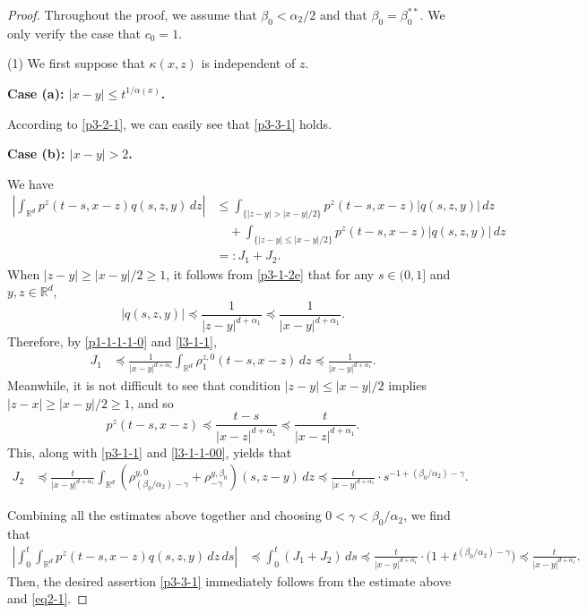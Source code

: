 \documentclass[a4paper,11pt]{amsart}
\renewcommand{\le}{\leqslant}
\renewcommand{\ge}{\geqslant}
\newcommand{\R}{\mathds R}
\newcommand{\B}{\beta}
\newcommand{\p}{\preceq}
\newcommand{\K}{\kappa}
\newcommand{\A}{\alpha}
\newcommand{\G}{\gamma}
\theoremstyle{definition}
\begin{document}
\begin{proof} Throughout the proof, we assume that $\B_0<\A_2/2$ and that $\B_0=\B_0^{**}.$ We only verify the case that $c_0=1$.

(1) We first suppose that $\K(x,z)$ is independent of $z$.

{\bf Case (a): $|x-y|\le t^{1/\A(x)}$.}


According to \eqref{p3-2-1}, we can easily see that \eqref{p3-3-1} holds.


{\bf Case (b): $|x-y|>2$.}

We have
\begin{equation}\label{p3-3-2}
\begin{split}
 \left|\int_{\R^d} p^z(t-s,x-z)q(s,z,y)\,dz\right|
&\le \int_{\{|z-y|>{|x-y|}/{2}\}} p^z(t-s,x-z)|q(s,z,y)|\,dz\\
&\quad
+\int_{\{|z-y|\le {|x-y|}/{2}\}} p^z(t-s,x-z)|q(s,z,y)|\,dz\\
&=:J_1+J_2.
\end{split}
\end{equation}When $|z-y|\ge {|x-y|}/{2}\ge 1$, it follows from \eqref{p3-1-2e} that for any $s\in (0,1]$ and $y,z\in \R^d$,
\begin{equation*}
|q(s,z,y)|\p \frac{1}{|z-y|^{d+\A_1}}\p \frac{1}{|x-y|^{d+\A_1}}.
\end{equation*}
Therefore, by \eqref{p1-1-1-1-0} and \eqref{l3-1-1},
\begin{align*}
J_1&\p \frac{1}{|x-y|^{d+\A_1}}\int_{\R^d}\rho^{z,0}_1(t-s,x-z)\, dz\p \frac{1}{|x-y|^{d+\A_1}}.
\end{align*}
Meanwhile, it is not difficult to see that condition $|z-y|\le {|x-y|}/{2}$ implies
$|z-x|\ge {|x-y|}/{2}\ge 1$, and so
\begin{equation*}
p^z(t-s,x-z)\p \frac{t-s}{|x-z|^{d+\A_1}}\p \frac{t}{|x-z|^{d+\A_1}}.
\end{equation*}
This, along with \eqref{p3-1-1} and \eqref{l3-1-1-00}, yields that
\begin{align*}
J_2&\p \frac{t}{|x-y|^{d+\A_1}}\int_{\R^d}\left(
\rho^{y,0}_{({\B_0}/{\A_2})-\G}+\rho^{y, \B_0}_{-\G}\right)(s,z-y)\, dz\p \frac{t}{|x-y|^{d+\A_1}}\cdot s^{-1+({\B_0}/{\A_2})-\G}.
\end{align*}


Combining all the estimates above together and choosing $0<\G<{\B_0}/{\A_2}$, we find that
\begin{align*}
 \left|\int_0^t \int_{\R^d}p^z(t-s,x-z)q(s,z,y)\,dz\,ds\right|
&\p \int_0^t (J_1+J_2)\,ds\p \frac{t}{|x-y|^{d+\A_1}}\cdot \big(1+t^{({\B_0}/{\A_2})-\G}\big)\!\p \frac{t}{|x-y|^{d+\A_1}}.
\end{align*}
Then, the desired assertion \eqref{p3-3-1}  immediately follows from the estimate above and \eqref{eq2-1}.


\end{proof}
\end{document}
